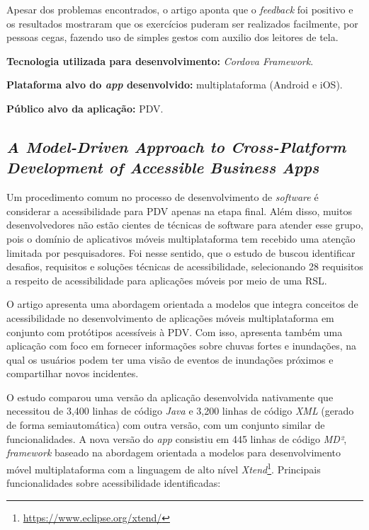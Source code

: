 Apesar dos problemas encontrados, o artigo aponta que o \emph{feedback} foi positivo e os resultados mostraram que os exercícios puderam ser realizados facilmente, por pessoas cegas,
fazendo uso de simples gestos com auxilio dos leitores de tela.

\textbf{Tecnologia utilizada para desenvolvimento:} \emph{Cordova Framework}.

\textbf{Plataforma alvo do \emph{app} desenvolvido:} multiplataforma (Android e iOS).

\textbf{Público alvo da aplicação:} PDV\@.

\subsection{\emph{A Model-Driven Approach to Cross-Platform Development of Accessible Business Apps}}

Um procedimento comum no processo de desenvolvimento de \emph{software} é considerar a acessibilidade para PDV apenas na etapa final.
Além disso, muitos desenvolvedores não estão cientes de técnicas de software para atender esse grupo, pois o domínio de aplicativos
móveis multiplataforma tem recebido uma atenção limitada por pesquisadores. Foi nesse sentido, que o estudo de 
buscou identificar desafios, requisitos e soluções técnicas de acessibilidade, selecionando 28 requisitos a respeito de acessibilidade para
aplicações móveis por meio de uma RSL\@.

O artigo apresenta uma abordagem orientada a modelos que integra conceitos de acessibilidade no desenvolvimento de aplicações móveis multiplataforma em conjunto com protótipos
acessíveis à PDV\@. Com isso, apresenta também uma aplicação com foco em fornecer informações sobre chuvas fortes e inundações, na qual
os usuários podem ter uma visão de eventos de inundações próximos e compartilhar novos incidentes.

O estudo comparou uma versão da aplicação desenvolvida nativamente que necessitou de 3,400 linhas de código \emph{Java} e 3,200 linhas de código \emph{XML}
(gerado de forma semiautomática) com outra versão, com um conjunto similar de funcionalidades. A nova versão do \emph{app} consistiu em 445 linhas de código \emph{MD²}, \emph{framework}
baseado na abordagem orientada a modelos para desenvolvimento móvel multiplataforma com a linguagem de alto nível \emph{Xtend}\footnote{\url{https://www.eclipse.org/xtend/}}.
Principais funcionalidades sobre acessibilidade identificadas:

